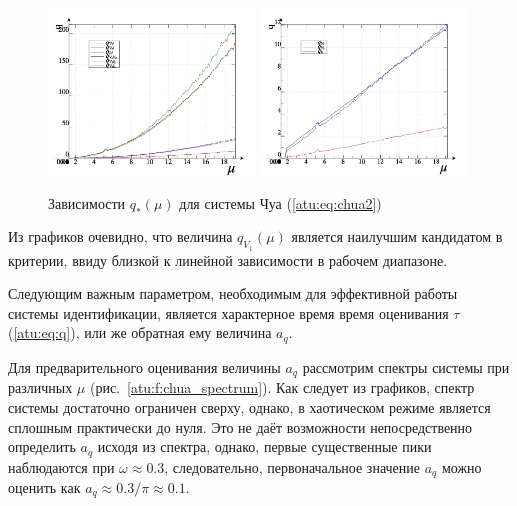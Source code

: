 \begin{figure}[htb!]
\centerline{
  \includegraphics[width=0.49\textwidth]{p/cha/chua/chua_q-p_mu2.png}
  \includegraphics[width=0.49\textwidth]{p/cha/chua/chua_q-p_mu1.png}
}
  \caption{Зависимости $q_{*}(\mu) $ для системы Чуа (\ref{atu:eq:chua2})}
\label{atu:f:chua_q}
\end{figure}

Из графиков очевидно, что величина $ q_{V_1}(\mu) $
является наилучшим кандидатом в критерии, ввиду близкой к линейной зависимости
в рабочем диапазоне.

Следующим важным параметром, необходимым для эффективной работы системы идентификации, является
характерное время время оценивания $\tau$ (\ref{atu:eq:q}), или же обратная ему величина $a_q$.

Для предварительного оценивания величины $a_q$ рассмотрим спектры системы при различных
$\mu$ (рис.~\ref{atu:f:chua_spectrum}). Как следует из графиков, спектр системы достаточно
ограничен сверху, однако, в хаотическом режиме является сплошным практически до нуля.
Это не даёт возможности непосредственно определить $a_q$ исходя из спектра,
однако, первые существенные пики наблюдаются при $ \omega \approx 0.3 $, следовательно,
первоначальное значение $a_q$ можно оценить как $ a_q \approx 0.3 / \pi \approx 0.1 $.


